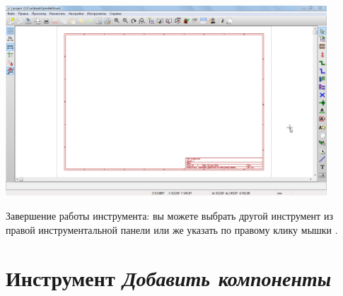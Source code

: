 \includegraphics[width=0.9\textwidth]{kicad/ee15.png}

Завершение работы инструмента: вы можете выбрать другой инструмент из правой
инструментальной панели или же указать  по правому
клику мышки \keys{\rms}.

\section{Инструмент \emph{Добавить компоненты}}

